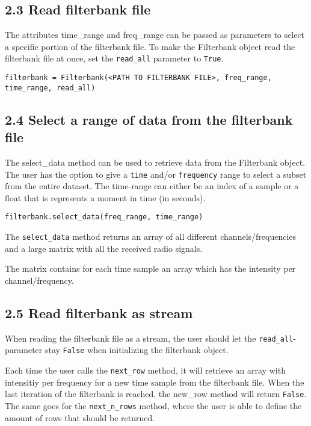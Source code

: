 \documentclass[]{article}
\begin{document}
\subsection{2.3 Read filterbank file}\label{read-filterbank-file}

The attributes time\_range and freq\_range can be passed as parameters
to select a specific portion of the filterbank file. To make the
Filterbank object read the filterbank file at once, set the
\texttt{read\_all} parameter to \texttt{True}.

\begin{verbatim}
filterbank = Filterbank(<PATH TO FILTERBANK FILE>, freq_range, time_range, read_all)
\end{verbatim}

\subsection{2.4 Select a range of data from the filterbank
file}\label{select-a-range-of-data-from-the-filterbank-file}

The select\_data method can be used to retrieve data from the Filterbank
object. The user has the option to give a \texttt{time} and/or
\texttt{frequency} range to select a subset from the entire dataset. The
time-range can either be an index of a sample or a float that is
represents a moment in time (in seconds).

\begin{verbatim}
filterbank.select_data(freq_range, time_range)
\end{verbatim}

The \texttt{select\_data} method returns an array of all different
channels/frequencies and a large matrix with all the received radio
signals.

The matrix contains for each time sample an array which has the
intensity per channel/frequency.

\subsection{2.5 Read filterbank as
stream}\label{read-filterbank-as-stream}

When reading the filterbank file as a stream, the user should let the
\texttt{read\_all}-parameter stay \texttt{False} when initializing the
filterbank object.

Each time the user calls the \texttt{next\_row} method, it will retrieve
an array with intensitiy per frequency for a new time sample from the
filterbank file. When the last iteration of the filterbank is reached,
the new\_row method will return \texttt{False}.\\
The same goes for the \texttt{next\_n\_rows} method, where the user is
able to define the amount of rows that should be returned.
\end{document}
